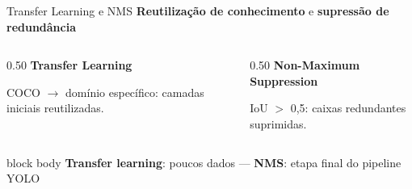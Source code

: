 \begin{frame}{Transfer Learning e NMS}
  \vspace{-2mm}
  {\small\color{sublabelcolor}%
    \textbf{Reutilização de conhecimento} e \textbf{supressão de redundância}}

  \vspace{1mm}

  \begin{columns}[c]
    \begin{column}{0.50\textwidth}
      \centering
      {\small\color{inputcolor}\textbf{Transfer Learning}}
      \vspace{1mm}

      \resizebox{1.05\textwidth}{!}{}

      \vspace{1mm}
      {\scriptsize\color{stagecolor}
        COCO $\rightarrow$ dom\'{i}nio espec\'{i}fico: camadas iniciais reutilizadas.}
    \end{column}
    \begin{column}{0.50\textwidth}
      \centering
      {\small\color{neckcolor}\textbf{Non-Maximum Suppression}}
      \vspace{1mm}

      \resizebox{1.05\textwidth}{!}{}

      \vspace{1mm}
      {\scriptsize\color{stagecolor}
        IoU $>$ 0,5: caixas redundantes suprimidas.}
    \end{column}
  \end{columns}

  \vfill

  \begin{beamercolorbox}[wd=\textwidth, rounded=true, shadow=false]{block body}
    \centering
    {\scriptsize\color{stagecolor}%
      \textbf{Transfer learning}: poucos dados --- \textbf{NMS}: etapa final do pipeline YOLO}
  \end{beamercolorbox}
\end{frame}

